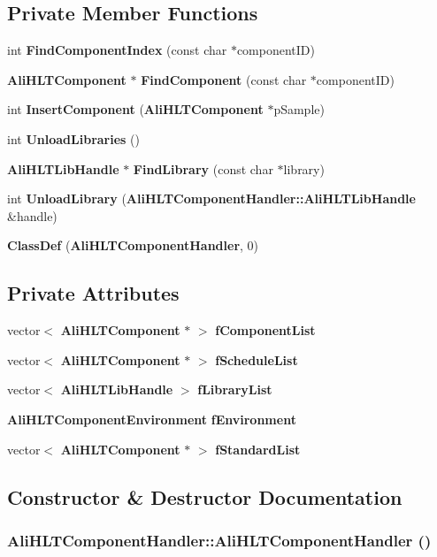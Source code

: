 \subsection*{Private Member Functions}
\begin{CompactItemize}
\item 
int {\bf Find\-Component\-Index} (const char $\ast$component\-ID)
\item 
{\bf Ali\-HLTComponent} $\ast$ {\bf Find\-Component} (const char $\ast$component\-ID)
\item 
int {\bf Insert\-Component} ({\bf Ali\-HLTComponent} $\ast$p\-Sample)
\item 
int {\bf Unload\-Libraries} ()
\item 
{\bf Ali\-HLTLib\-Handle} $\ast$ {\bf Find\-Library} (const char $\ast$library)
\item 
int {\bf Unload\-Library} ({\bf Ali\-HLTComponent\-Handler::Ali\-HLTLib\-Handle} \&handle)
\item 
{\bf Class\-Def} ({\bf Ali\-HLTComponent\-Handler}, 0)
\end{CompactItemize}
\subsection*{Private Attributes}
\begin{CompactItemize}
\item 
vector$<$ {\bf Ali\-HLTComponent} $\ast$ $>$ {\bf f\-Component\-List}
\item 
vector$<$ {\bf Ali\-HLTComponent} $\ast$ $>$ {\bf f\-Schedule\-List}
\item 
vector$<$ {\bf Ali\-HLTLib\-Handle} $>$ {\bf f\-Library\-List}
\item 
{\bf Ali\-HLTComponent\-Environment} {\bf f\-Environment}
\item 
vector$<$ {\bf Ali\-HLTComponent} $\ast$ $>$ {\bf f\-Standard\-List}
\end{CompactItemize}


\subsection{Constructor \& Destructor Documentation}
\subsubsection{\setlength{\rightskip}{0pt plus 5cm}Ali\-HLTComponent\-Handler::Ali\-HLTComponent\-Handler ()}\label{classAliHLTComponentHandler_a0}


